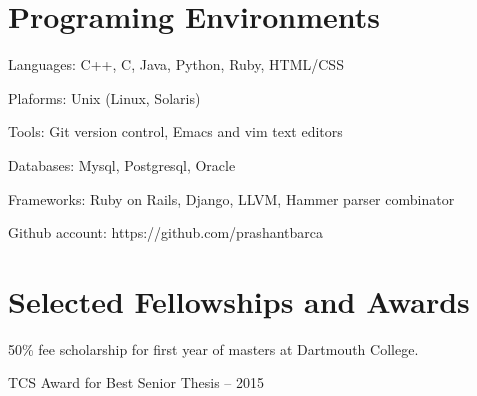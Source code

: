 \documentclass[letterpaper,10pt]{article}
\renewenvironment{itemize}{
  \begin{list}{}{
    \setlength{\leftmargin}{1.5em}
  }
}{
  \end{list}
}
\begin{document}
\section*{Programing Environments}
\setlength\itemsep{0ex}
\begin {itemize}
\setlength\itemsep{0ex}
\item Languages: C++, C, Java, Python, Ruby, HTML/CSS
\item Plaforms: Unix (Linux, Solaris)
\item Tools: Git version control, Emacs and vim text editors
\item Databases: Mysql, Postgresql, Oracle
\item Frameworks: Ruby on Rails, Django, LLVM, Hammer parser combinator
\item Github account: https://github.com/prashantbarca
\end{itemize}

\section*{Selected Fellowships and Awards}
\setlength\itemsep{0ex}
\begin {itemize}
\setlength\itemsep{0ex}
\item 50\% fee scholarship for first year of masters at Dartmouth College. 
\item TCS Award for Best Senior Thesis -- 2015
\end{itemize}
\end{document}
